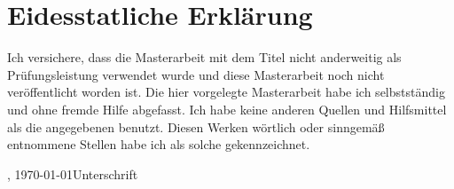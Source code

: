 
\chapter*{Eidesstatliche Erklärung}
\label{sec:EidesstatlicheErklaerung}

Ich versichere, dass die Masterarbeit mit dem Titel \glqq{}\titel\grqq{} nicht anderweitig als Prüfungsleistung verwendet wurde und diese Masterarbeit noch nicht veröffentlicht worden ist. Die hier vorgelegte Masterarbeit habe ich selbstständig und ohne fremde Hilfe abgefasst. Ich habe keine anderen Quellen und Hilfsmittel als die angegebenen benutzt. Diesen Werken wörtlich oder sinngemäß entnommene Stellen habe ich als solche gekennzeichnet.
\vfill

\begin{center}
\begin{minipage}{0.9\textwidth}
\ort, \today \hfill  Unterschrift
\end{minipage}
\end{center}



